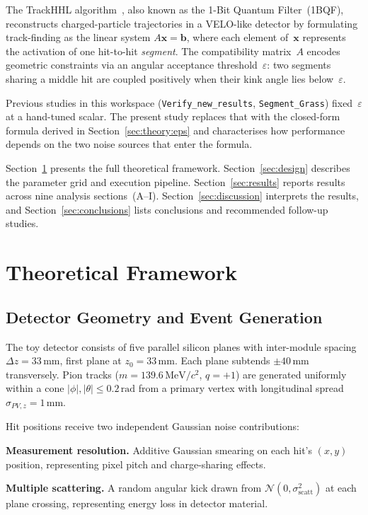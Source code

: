 \documentclass[11pt,a4paper]{article}
\newcommand{\eps}{\varepsilon}
\newcommand{\sres}{\sigma_{\mathrm{res}}}
\newcommand{\sscat}{\sigma_{\mathrm{scatt}}}
\newcommand{\Dz}{\Delta z}
\newcommand{\codepath}[1]{\texttt{#1}}
\begin{document}
The TrackHHL algorithm~\cite{onebqf}, also known as the 1-Bit Quantum Filter~(1BQF),
reconstructs charged-particle trajectories in a VELO-like detector by formulating
track-finding as the linear system $A\mathbf{x}=\mathbf{b}$, where each element
of~$\mathbf{x}$ represents the activation of one hit-to-hit \emph{segment}.
The compatibility matrix~$A$ encodes geometric constraints via an angular acceptance
threshold~$\eps$: two segments sharing a middle hit are coupled positively when their
kink angle lies below~$\eps$.

Previous studies in this workspace (\codepath{Verify\_new\_results},
\codepath{Segment\_Grass}) fixed~$\eps$ at a hand-tuned scalar.  The present study
replaces that with the closed-form formula derived in Section~\ref{sec:theory:eps} and
characterises how performance depends on the two noise sources that enter the formula.

Section~\ref{sec:theory} presents the full theoretical framework.
Section~\ref{sec:design} describes the parameter grid and execution pipeline.
Section~\ref{sec:results} reports results across nine analysis sections~(A--I).
Section~\ref{sec:discussion} interprets the results, and Section~\ref{sec:conclusions}
lists conclusions and recommended follow-up studies.

\section{Theoretical Framework}
\label{sec:theory}

\subsection{Detector Geometry and Event Generation}
\label{sec:theory:geom}

The toy detector consists of five parallel silicon planes with inter-module spacing
$\Dz=33\,\mathrm{mm}$, first plane at $z_0=33\,\mathrm{mm}$.  Each plane subtends
$\pm40\,\mathrm{mm}$ transversely.  Pion tracks
($m=139.6\,\mathrm{MeV}/c^2$, $q=+1$) are generated uniformly within a cone
$|\phi|,|\theta|\leq0.2\,\mathrm{rad}$ from a primary vertex with longitudinal spread
$\sigma_{PV,z}=1\,\mathrm{mm}$.

Hit positions receive two independent Gaussian noise contributions:
\begin{description}[leftmargin=2.2cm,style=sameline]
  \item[$\sres$] \textbf{Measurement resolution.}
        Additive Gaussian smearing on each hit's $(x,y)$ position, representing pixel
        pitch and charge-sharing effects.
  \item[$\sscat$] \textbf{Multiple scattering.}
        A random angular kick drawn from $\mathcal{N}(0,\sscat^2)$ at each plane
        crossing, representing energy loss in detector material.
\end{description}
\end{document}
